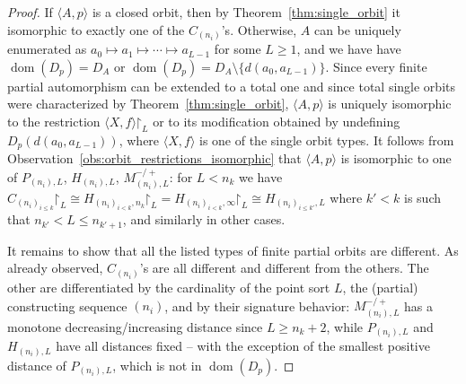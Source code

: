 \documentclass[oneside,notitlepage,12pt]{article}
\theoremstyle{definition}
\theoremstyle{remark}
\newcommand \set [1]{\{#1\}}
\newcommand \seq [1]{\langle #1 \rangle}
\newcommand \restr [1] {\mathord{\upharpoonright}_{#1}}
\newcommand \dom {\operatorname{dom}}
\begin{document}
\begin{proof}
    
    If $\seq{A, p}$ is a closed orbit, then by Theorem~\ref{thm:single_orbit} it isomorphic to exactly one of the $C_{(n_i)}$'s.
    Otherwise, $A$ can be uniquely enumerated as $a_0 \mapsto a_1 \mapsto \cdots \mapsto a_{L - 1}$ for some $L \geq 1$, and we have have $\dom(D_p) = D_A$ or $\dom(D_p) = D_A \setminus \set{d(a_0, a_{L - 1})}$.
    Since every finite partial automorphism can be extended to a total one and since total single orbits were characterized by Theorem~\ref{thm:single_orbit}, $\seq{A, p}$ is uniquely isomorphic to the restriction $\seq{X, f}\restr{L}$ or to its modification  obtained by undefining  $D_p(d(a_0, a_{L - 1}))$, where $\seq{X, f}$ is one of the single orbit types.
    It follows from Observation~\ref{obs:orbit_restrictions_isomorphic} that $\seq{A, p}$ is isomorphic to one of $P_{(n_i), L}$, $H_{(n_i), L}$, $M^{-/+}_{(n_i), L}$: 
    for $L < n_k$ we have $C_{(n_i)_{i\leq k}}\restr{L} \cong H_{(n_i)_{i < k}, n_k}\restr{L} = H_{(n_i)_{i < k}, \infty}\restr{L} \cong H_{(n_i)_{i \leq k'}, L}$ where $k' < k$ is such that $n_{k'} < L \leq n_{k' + 1}$, and similarly in other cases.

    It remains to show that all the listed types of finite partial orbits are different.
    As already observed, $C_{(n_i)}$'s are all different and different from the others.
    The other are differentiated by the cardinality of the point sort $L$, the (partial) constructing sequence $(n_i)$, and by their signature behavior:
    $M^{-/+}_{(n_i), L}$ has a monotone decreasing/increasing distance since $L \geq n_k + 2$, while $P_{(n_i), L}$ and $H_{(n_i), L}$ have all distances fixed – with the exception of the smallest positive distance of $P_{(n_i), L}$, which is not in $\dom(D_p)$.
\end{proof}


\color{black}
\end{document}
